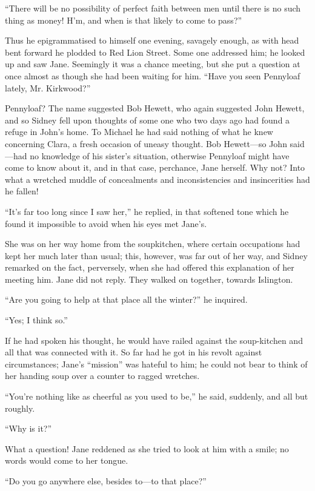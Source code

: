 ``There will be no possibility of perfect faith between men until there
is no such thing as money! H'm, and when is that likely to come to
pass?''

Thus he epigrammatised to himself one evening, savagely enough, as with
head bent forward he plodded to Red Lion Street. Some one addressed him;
he looked up and saw Jane. Seemingly it was a chance meeting, but she
put a question at once almost as though she had been waiting for him.
``Have you seen Pennyloaf lately, Mr. Kirkwood?''

{\protect\hypertarget{21}{}{}}Pennyloaf? The name suggested Bob Hewett,
who again suggested John Hewett, and so Sidney fell upon thoughts of
some one who two days ago had found a refuge in John's home. To Michael
he had said nothing of what he knew concerning Clara, a fresh occasion
of uneasy thought. Bob Hewett---so John said---had no knowledge of his
sister's situation, otherwise Pennyloaf might have come to know about
it, and in that case, perchance, Jane herself. Why not? Into what a
wretched muddle of concealments and inconsistencies and insincerities
had he fallen!

``It's far too long since I saw her,'' he replied, in that softened tone
which he found it impossible to avoid when his eyes met Jane's.

She was on her way home from the soupkitchen, where certain occupations
had kept her much later than usual; this, however, was far out of her
way, and Sidney remarked on the fact, perversely, when she had offered
this explanation of her meeting him. Jane did not reply. They walked on
together, towards Islington.

``Are you going to help at that place all the winter?'' he inquired.

{\protect\hypertarget{22}{}{}}``Yes; I think so.''

If he had spoken his thought, he would have railed against the
soup-kitchen and all that was connected with it. So far had he got in
his revolt against circumstances; Jane's ``mission'' was hateful to him;
he could not bear to think of her handing soup over a counter to ragged
wretches.

``You're nothing like as cheerful as you used to be,'' he said,
suddenly, and all but roughly.

``Why is it?''

What a question! Jane reddened as she tried to look at him with a smile;
no words would come to her tongue.

``Do you go anywhere else, besides to---to that place?''

